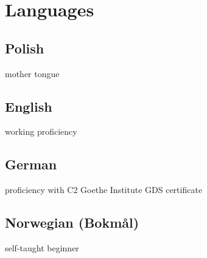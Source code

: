 \documentclass[]{lib/cv}
\begin{document}
\begin{minipage}[t]{0.30\textwidth}
\section{Languages}
  \subsection{Polish}
  mother tongue \\
  \sectionsep
  \subsection{English}
  working proficiency \\
  \sectionsep
  \subsection{German}
  proficiency with C2 Goethe Institute GDS certificate \\
  \sectionsep
  \subsection{Norwegian (Bokmål)}
  self-taught beginner \\
  \sectionsep

\end{minipage} 
\end{document}
